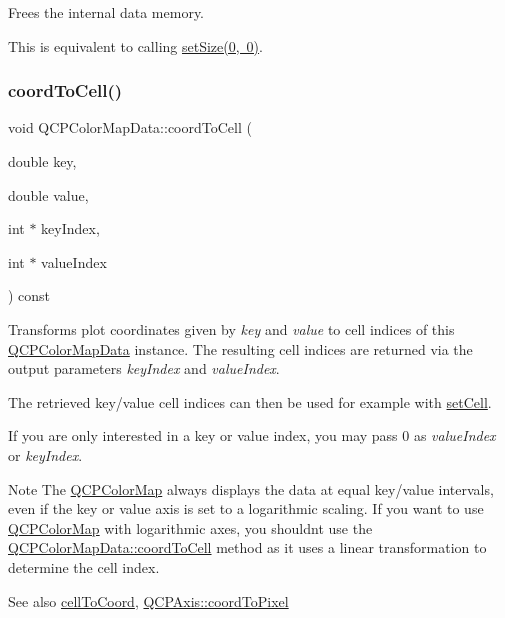 Frees the internal data memory.

This is equivalent to calling \mbox{\hyperlink{class_q_c_p_color_map_data_a0d9ff35c299d0478b682bfbcdd9c097e}{set\+Size(0, 0)}}. \mbox{\label{class_q_c_p_color_map_data_aca5b29e0ca2f299c9060fc6e1f74d0c8}} 
\subsubsection{\texorpdfstring{coord\+To\+Cell()}{coordToCell()}}
{\footnotesize\ttfamily void Q\+C\+P\+Color\+Map\+Data\+::coord\+To\+Cell (\begin{DoxyParamCaption}\item[{double}]{key,  }\item[{double}]{value,  }\item[{int $\ast$}]{key\+Index,  }\item[{int $\ast$}]{value\+Index }\end{DoxyParamCaption}) const}

Transforms plot coordinates given by {\itshape key} and {\itshape value} to cell indices of this \mbox{\hyperlink{class_q_c_p_color_map_data}{Q\+C\+P\+Color\+Map\+Data}} instance. The resulting cell indices are returned via the output parameters {\itshape key\+Index} and {\itshape value\+Index}.

The retrieved key/value cell indices can then be used for example with \mbox{\hyperlink{class_q_c_p_color_map_data_a8e75eaf8746596319032a93f3d2d0683}{set\+Cell}}.

If you are only interested in a key or value index, you may pass 0 as {\itshape value\+Index} or {\itshape key\+Index}.

\begin{DoxyNote}{Note}
The \mbox{\hyperlink{class_q_c_p_color_map}{Q\+C\+P\+Color\+Map}} always displays the data at equal key/value intervals, even if the key or value axis is set to a logarithmic scaling. If you want to use \mbox{\hyperlink{class_q_c_p_color_map}{Q\+C\+P\+Color\+Map}} with logarithmic axes, you shouldn\textquotesingle{}t use the \mbox{\hyperlink{class_q_c_p_color_map_data_aca5b29e0ca2f299c9060fc6e1f74d0c8}{Q\+C\+P\+Color\+Map\+Data\+::coord\+To\+Cell}} method as it uses a linear transformation to determine the cell index.
\end{DoxyNote}
\begin{DoxySeeAlso}{See also}
\mbox{\hyperlink{class_q_c_p_color_map_data_af1a36385c78ab624cd617065602408b6}{cell\+To\+Coord}}, \mbox{\hyperlink{class_q_c_p_axis_af15d1b3a7f7e9b53d759d3ccff1fe4b4}{Q\+C\+P\+Axis\+::coord\+To\+Pixel}} 
\end{DoxySeeAlso}
\mbox{\label{class_q_c_p_color_map_data_a350f783260eb9b5de5c7b5e0d5d3e3c2}} 
